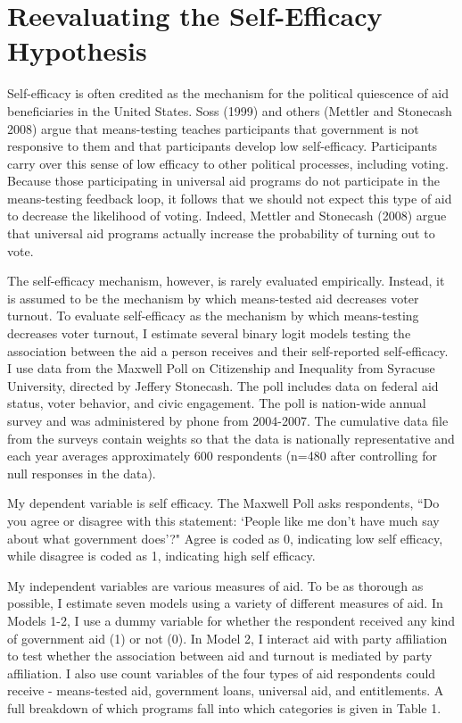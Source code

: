 \documentclass[12pt]{paper}
\begin{document}
\section{Reevaluating the Self-Efficacy Hypothesis}
Self-efficacy is often credited as the mechanism for the political quiescence of aid beneficiaries in the United States. Soss (1999) and others (Mettler and Stonecash 2008) argue that means-testing teaches participants that government is not responsive to them and that participants develop low self-efficacy. Participants carry over this sense of low efficacy to other political processes, including voting. Because those participating in universal aid programs do not participate in the means-testing feedback loop, it follows that we should not expect this type of aid to decrease the likelihood of voting. Indeed, Mettler and Stonecash (2008) argue that universal aid programs actually increase the probability of turning out to vote. 

The self-efficacy mechanism, however, is rarely evaluated empirically. Instead, it is assumed to be the mechanism by which means-tested aid decreases voter turnout. To evaluate self-efficacy as the mechanism by which means-testing decreases voter turnout, I estimate several binary logit models testing the association between the aid a person receives and their self-reported self-efficacy. I use data from the Maxwell Poll on Citizenship and Inequality from Syracuse University, directed by Jeffery Stonecash. The poll includes data on federal aid status, voter behavior, and civic engagement. The poll is nation-wide annual survey and was administered by phone from 2004-2007. The cumulative data file from the surveys contain weights so that the data is nationally representative and each year averages approximately 600 respondents (n=480 after controlling for null responses in the data).

My dependent variable is self efficacy. The Maxwell Poll asks respondents, ``Do you agree or disagree with this statement: `People like me don’t have much say about what government does'?" Agree is coded as 0, indicating low self efficacy, while disagree is coded as 1, indicating high self efficacy.

My independent variables are various measures of aid. To be as thorough as possible, I estimate seven models using a variety of different measures of aid. In Models 1-2, I use a dummy variable for whether the respondent received any kind of government aid (1) or not (0). In Model 2, I interact aid with party affiliation to test whether the association between aid and turnout is mediated by party affiliation. I also use count variables of the four types of aid respondents could receive - means-tested aid, government loans, universal aid, and entitlements. A full breakdown of which programs fall into which categories is given in Table 1.
\end{document}
